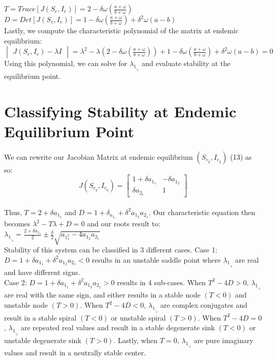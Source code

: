 \documentclass[%
 reprint,
]{revtex4-2}
\begin{document}
$T=Trace[J(S_e,I_e)]=2-\delta\omega(\frac{a+\omega}{b+\omega})$ \\
$D=Det[J(S_e,I_e)]=1-\delta\omega(\frac{a+\omega}{b+\omega}) + \delta^2\omega(a-b)$\\

Lastly, we compute the characteristic polynomial of the matrix at endemic equilibrium: \\

$\begin{vmatrix} J(S_e,I_e)-\lambda I\end{vmatrix} = \lambda^2 - \lambda(2-\delta\omega(\frac{a+\omega}{b+\omega}))+1-\delta\omega(\frac{a+\omega}{b+\omega}) + \delta^2\omega(a-b)=0$ \\

Using this polynomial, we can solve for $\lambda_1_,_2$ and evaluate stability at the equilibrium point.


\section{\label{sec:level1}Classifying Stability at Endemic Equilibrium Point \protect\\}

We can rewrite our Jacobian Matrix at endemic equilibrium $(S_e_q,I_e_q)$ (13) as so: \\

\begin{equation}
J(S_e_q,I_e_q) = \begin{bmatrix} 
1+\delta a_1_1 & -\delta a_1_2 \\
\delta a_2_1 & 1 \end{bmatrix}
\end{equation} \\

Thus, $T=2+\delta a_1_1$ and $D=1+\delta_a_1_1 + \delta^2a_1_2 a_2_1$. Our characteristic equation then becomes $\lambda^2 - T\lambda + D = 0$ and our roots result to: \\

$\lambda_1_,_2 = \frac{2+\delta a_1_1}{2} \pm \frac{\delta}{2}\sqrt{a_1_1^2 - 4a_1_2 a_2_1}$ \\

Stability of this system can be classified in 3 different cases. 
Case 1: $D = 1 + \delta a_1_1 + \delta^2 a_1_2 a_2_1 < 0$ results in an unstable saddle point where $\lambda_1_,_2$ are real and have different signs. \\

Case 2: $D = 1 + \delta a_1_1 + \delta^2 a_1_2 a_2_1 > 0$ results in 4 sub-cases. When $T^2-4D>0$, $\lambda_1_,_2$ are real with the same sign, and either results in a stable node $(T<0)$ and unstable node $(T>0)$. When $T^2-4D<0$, $\lambda_1_,_2$ are complex conjugates and result in a stable spiral $(T<0)$ or unstable spiral $(T>0)$. When $T^2-4D=0$, $\lambda_1_,_2$ are repeated real values and result in a stable degenerate sink $(T<0)$ or unstable degenerate sink $(T>0)$. Lastly, when $T=0$, $\lambda_1_,_2$ are pure imaginary values and result in a neutrally stable center. \\
\end{document}
